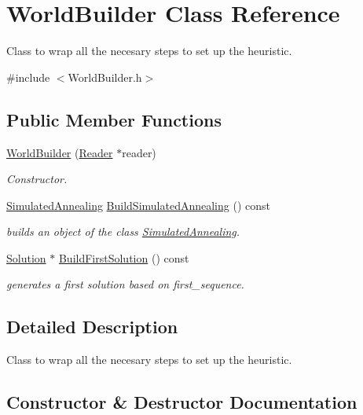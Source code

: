 \hypertarget{classWorldBuilder}{}\section{World\+Builder Class Reference}
\label{classWorldBuilder}


Class to wrap all the necesary steps to set up the heuristic.  




{\ttfamily \#include $<$World\+Builder.\+h$>$}

\subsection*{Public Member Functions}
\begin{DoxyCompactItemize}
\item 
\hyperlink{classWorldBuilder_a365f9eff5360c59d3d68bbcd46445324}{World\+Builder} (\hyperlink{classReader}{Reader} $\ast$reader)
\begin{DoxyCompactList}\small\item\em Constructor. \end{DoxyCompactList}\item 
\hyperlink{classSimulatedAnnealing}{Simulated\+Annealing} \hyperlink{classWorldBuilder_a128c41fff6a87b5c9dbff6d43e9bc747}{Build\+Simulated\+Annealing} () const
\begin{DoxyCompactList}\small\item\em builds an object of the class \hyperlink{classSimulatedAnnealing}{Simulated\+Annealing}. \end{DoxyCompactList}\item 
\hyperlink{classSolution}{Solution} $\ast$ \hyperlink{classWorldBuilder_a1ced8bec93da65ab264264a2c6a380e9}{Build\+First\+Solution} () const
\begin{DoxyCompactList}\small\item\em generates a first solution based on first\+\_\+sequence. \end{DoxyCompactList}\end{DoxyCompactItemize}


\subsection{Detailed Description}
Class to wrap all the necesary steps to set up the heuristic. 

\subsection{Constructor \& Destructor Documentation}
\mbox{\label{classWorldBuilder_a365f9eff5360c59d3d68bbcd46445324}} 
